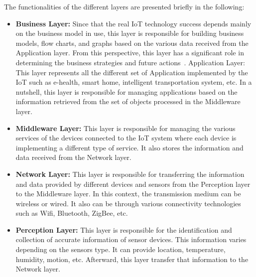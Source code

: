 The functionalities of the different layers are presented briefly in the following:
\begin{itemize}
\item \textbf{Business Layer:} Since that the real IoT technology success depends mainly on the business model in use, this layer is responsible for building business models, flow charts, and graphs based on the various data received from the Application layer. From this perspective, this layer has a significant role in determining the business strategies and future actions~\cite{archi}.
Application Layer: This layer represents all the different set of Application implemented by the IoT such as e-health, smart home, intelligent transportation system, etc. In a nutshell, this layer is responsible for managing applications based on the information retrieved from the set of objects processed in the Middleware layer.
\item \textbf{Middleware Layer:} This layer is responsible for managing the various services of the devices connected to the IoT system where each device is implementing a different type of service. It also stores the information and data received from the Network layer.\par
\item \textbf{Network Layer:} This layer is responsible for transferring the information and data provided by different devices and sensors from the Perception layer to the Middleware layer. In this context, the transmission medium can be wireless or wired. It also can be through various connectivity technologies such as Wifi, Bluetooth, ZigBee, etc.  
\item \textbf{Perception Layer:} This layer is responsible for the identification and collection of accurate information of sensor devices. This information varies depending on the sensors type. It can provide location, temperature, humidity, motion, etc. Afterward, this layer transfer that information to the Network layer.
\end{itemize}
